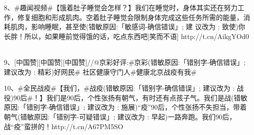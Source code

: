 8、\#趣闻视频\#【饿着肚子睡觉会怎样？】我们在睡觉时，身体其实还在努力工作，修复细胞和形成肌肉。空着肚子睡觉会限制身体完成这些任务所需的能量，消耗肌肉，影响睡眠，{\color{red}甚至使(错敏原因:「敏感词-确信错误」; 建
议改为 : 致使)}你长胖！所以，如果睡前觉得饿的话，吃点东西吧[笑而不语] http://t.cn/AikgYOd0 ​

9、[中国赞][中国赞][中国赞]//@京彩好评:\#{\color{red}京彩(错敏原因:「错别字-确信错误」; 建议改为 : 精彩)}好网民\# 社区健康守门人\#健康北京战疫有我\#

10、\#全民战疫\#【我们，\#{\color{red}战疫(错敏原因:「错别字-确信错误」; 建议改为 : 战役)}90后\#！】我们是90后，个性张扬有朝气，有时还有点孩子气。我们{\color{red}是战(错敏原因:「错别字-确信错误」; 建议改为 : 施展)“疫”90后}，个性张扬不失担当，带着{\color{red}朝气(错敏原因:「错别字-可疑错误」; 建议改为 : 早起)}一路奔跑。我们90后，战“疫”蛮拼的！http://t.cn/A67PM5SO ​
